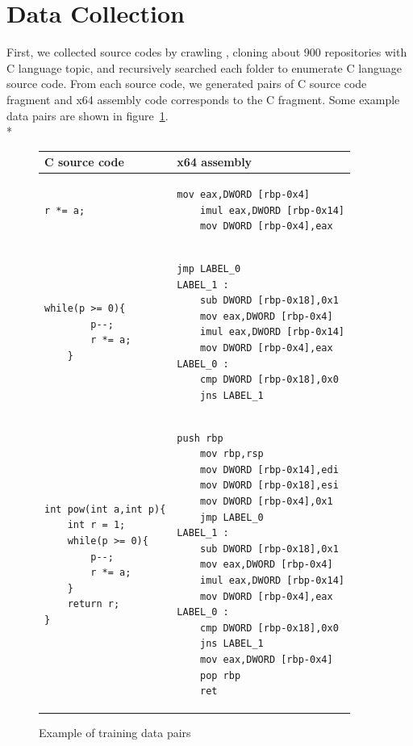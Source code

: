 \documentclass[senior,final,11pt]{iscs-thesis}
\begin{document}
\section{Data Collection}
First, we collected source codes by crawling \cite[GitHub]{github}, cloning about 900 repositories with C language topic, 
and recursively searched each folder to enumerate C language source code.
From each source code, we generated pairs of C source code fragment and x64 assembly code corresponds to the C fragment.
Some example data pairs are shown in figure~\ref{fig:pairsoffragments}. 
\\*

\begin{figure}
	\begin{tabular}{|l|l|} \hline
	 C source code & x64 assembly \\ \hline 
		\begin{lstlisting}[style=Csample]
		r *= a;
		\end{lstlisting}
		&
		\begin{lstlisting}[style=Asmsample]
	mov eax,DWORD [rbp-0x4]
	imul eax,DWORD [rbp-0x14]
	mov DWORD [rbp-0x4],eax
		\end{lstlisting} \\ \hline	
		\begin{lstlisting}[style=Csample]
	while(p >= 0){
		p--;
		r *= a;
	}
		\end{lstlisting}
		&
		\begin{lstlisting}[style=Asmsample]
	jmp LABEL_0
LABEL_1 :
	sub DWORD [rbp-0x18],0x1
	mov eax,DWORD [rbp-0x4]
	imul eax,DWORD [rbp-0x14]
	mov DWORD [rbp-0x4],eax
LABEL_0 :
	cmp DWORD [rbp-0x18],0x0
	jns LABEL_1
		\end{lstlisting} \\ \hline		
		\begin{lstlisting}[style=Csample]
int pow(int a,int p){
	int r = 1;
	while(p >= 0){
		p--;
		r *= a;
	}
	return r;
}
		\end{lstlisting}
		&
		\begin{lstlisting}[style=Asmsample]
	push rbp
	mov rbp,rsp
	mov DWORD [rbp-0x14],edi
	mov DWORD [rbp-0x18],esi
	mov DWORD [rbp-0x4],0x1
	jmp LABEL_0
LABEL_1 :
	sub DWORD [rbp-0x18],0x1
	mov eax,DWORD [rbp-0x4]
	imul eax,DWORD [rbp-0x14]
	mov DWORD [rbp-0x4],eax
LABEL_0 :
	cmp DWORD [rbp-0x18],0x0
	jns LABEL_1
	mov eax,DWORD [rbp-0x4]
	pop rbp
	ret
		\end{lstlisting} \\ \hline
	\end{tabular}
	\caption{Example of training data pairs}
	\label{fig:pairsoffragments}
\end{figure}
\end{document}

